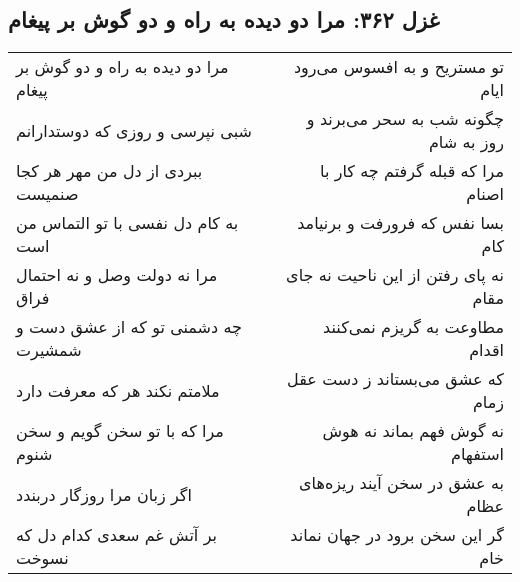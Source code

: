 \begin{center}
\section*{غزل ۳۶۲: مرا دو دیده به راه و دو گوش بر پیغام}
\label{sec:362}
\begin{longtable}{l p{0.5cm} r}
مرا دو دیده به راه و دو گوش بر پیغام
&&
تو مستریح و به افسوس می‌رود ایام
\\
شبی نپرسی و روزی که دوستدارانم
&&
چگونه شب به سحر می‌برند و روز به شام
\\
ببردی از دل من مهر هر کجا صنمیست
&&
مرا که قبله گرفتم چه کار با اصنام
\\
به کام دل نفسی با تو التماس من است
&&
بسا نفس که فرورفت و برنیامد کام
\\
مرا نه دولت وصل و نه احتمال فراق
&&
نه پای رفتن از این ناحیت نه جای مقام
\\
چه دشمنی تو که از عشق دست و شمشیرت
&&
مطاوعت به گریزم نمی‌کنند اقدام
\\
ملامتم نکند هر که معرفت دارد
&&
که عشق می‌بستاند ز دست عقل زمام
\\
مرا که با تو سخن گویم و سخن شنوم
&&
نه گوش فهم بماند نه هوش استفهام
\\
اگر زبان مرا روزگار دربندد
&&
به عشق در سخن آیند ریزه‌های عظام
\\
بر آتش غم سعدی کدام دل که نسوخت
&&
گر این سخن برود در جهان نماند خام
\\
\end{longtable}
\end{center}
